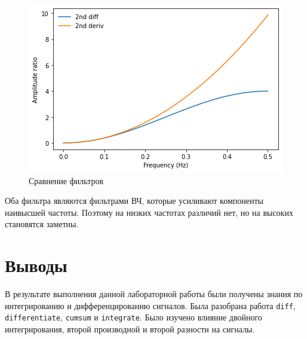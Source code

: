 \documentclass[a4paper, 14pt]{extarticle}
\begin{document}
    \begin{figure}[H]
        \centering
        \includegraphics[width=0.8\linewidth]{double_filter}
        \caption{Сравнение фильтров}
        \label{fig:double_filter}
    \end{figure}

    Оба фильтра являются фильтрами ВЧ, которые усиливают компоненты наивысшей частоты.
    Поэтому на низких частотах различий нет, но на высоких становятся заметны.

    \newpage


    \section{Выводы}
    \label{sec:conclusions}

    В результате выполнения данной лабораторной работы были получены знания по интегрированию и дифференцированию сигналов.
    Была разобрана работа \texttt{diff}, \texttt{differentiate}, \texttt{cumsum} и \texttt{integrate}.
    Было изучено влияние двойного интегрирования, второй производной и второй разности на сигналы.
\end{document}
